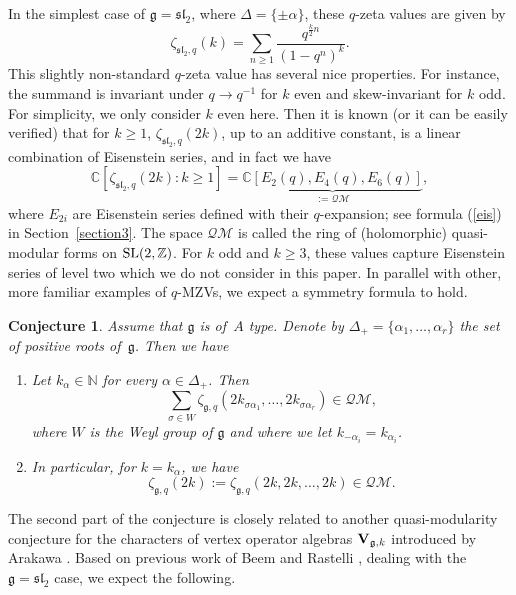 \documentclass[pdftex]{sigma}
\numberwithin{equation}{section}
\newtheorem{Conjecture}[Theorem]{Conjecture}
\theoremstyle{definition}
\begin{document}
In the simplest case of $\mathfrak{g}=\mathfrak{sl}_2$, where $\Delta=\{ \pm \alpha \}$, these $q$-zeta values are given by
\[
\zeta_{\mathfrak{sl}_2,q}(k)=\sum_{n \geq 1} \frac{q^{\frac{k}{2}n}}{(1-q^n)^k}.
\]
This slightly non-standard $q$-zeta value has several nice properties. For instance, the summand is invariant under $q \to q^{-1}$ for $k$ even and skew-invariant for $k$ odd. For simplicity, we only consider $k$ even here.
Then it is known (or it can be easily verified) that for $k \geq 1$, $\zeta_{\mathfrak{sl}_2,q}(2k)$, up to an additive constant, is a linear combination of Eisenstein series, and in fact we have
\begin{equation*} %
\mathbb{C}[\zeta_{\mathfrak{sl}_2,q}(2k): k \geq 1]=\underbrace{\mathbb{C}[E_2(q),E_4(q),E_6(q)]}_{:=\mathcal{QM}},
\end{equation*}
where $E_{2i}$ are Eisenstein series defined with their $q$-expansion; see formula (\ref{eis}) in Section~\ref{section3}.
The space $\mathcal{QM}$ is called the ring of (holomorphic) quasi-modular forms on ${\rm SL}(2,\mathbb{Z})$.
For $k$ odd and $k \geq 3$, these values
capture Eisenstein series of level two which we do not consider in this paper.
In parallel with other, more familiar examples of $q$-MZVs, we expect a symmetry formula to hold.
\begin{Conjecture} \label{mzvgq} Assume that $\mathfrak{g}$ is of~$A$ type. Denote by $\Delta_+=\{ \alpha_1,\dots,\alpha_r \}$ the set of positive roots of~$\mathfrak{g}$.
Then we have
\begin{enumerate}\itemsep=0pt
\item[$(i)$] Let $k_\alpha \in \mathbb{N}$ for every $\alpha \in \Delta_+$. Then
\[
\sum_{\sigma \in W} \zeta_{\mathfrak{g},q}(2k_{\sigma \alpha_1},\dots,2k_{\sigma \alpha_r}) \in \mathcal{QM},
\]
where $W$ is the Weyl group of $\mathfrak{g}$ and where we let $k_{-\alpha_i}=k_{\alpha_i}$.

\item[$(ii)$] In particular, for $k=k_\alpha$, we have
\begin{equation*} %
\zeta_{\mathfrak{g},q}(2k):=\zeta_{\mathfrak{g},q}(2k,2k,\dots,2k) \in \mathcal{QM}.
\end{equation*}
\end{enumerate}
\end{Conjecture}

The second part of the conjecture is closely related to another quasi-modularity conjecture for the characters of vertex operator algebras ${\bf V}_{\mathfrak{g},k}$ introduced by Arakawa \cite{Arakawa}.
Based on previous work of Beem and Rastelli \cite{Beem}, dealing with the $\mathfrak{g}=\mathfrak{sl}_2$ case, we expect the following.
\end{document}
